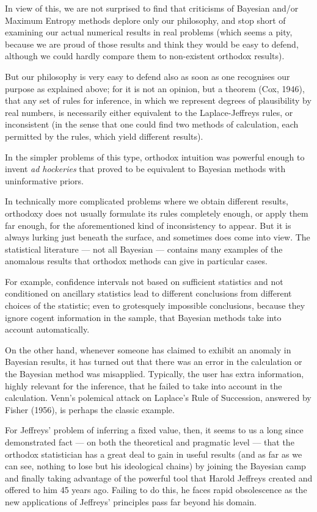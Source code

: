 \documentclass[12pt]{article}
\begin{document}
In view of this, we are not surprised to find that
criticisms of Bayesian and/or Maximum Entropy methods deplore
only our philosophy, and stop short of examining our actual
numerical results in real problems (which seems a pity, because
we are proud of those results and think they would be easy to
defend, although we could hardly compare them to non-existent
orthodox results).

But our philosophy is very easy to defend also as soon as
one recognises our purpose as explained above; for it is not an
opinion, but a theorem (Cox, 1946), that any set of rules for
inference, in which we represent degrees of plausibility by
real numbers, is necessarily either equivalent to the Laplace-Jeffreys rules, or inconsistent (in the sense that one could find two methods of calculation, each permitted by the rules,
which yield different results).

In the simpler problems of this type, orthodox intuition
was powerful enough to invent \emph{ad hockeries} that proved to be
equivalent to Bayesian methods with uninformative priors.

In technically more complicated problems where we obtain
different results, orthodoxy does not usually formulate its
rules completely enough, or apply them far enough, for the
aforementioned kind of inconsistency to appear. But it is
always lurking just beneath the surface, and sometimes does
come into view. The statistical literature --- not all Bayesian
--- contains many examples of the anomalous results that
orthodox methods can give in particular cases.

For example, confidence intervals not based on sufficient
statistics and not conditioned on ancillary statistics lead to
different conclusions from different choices of the statistic;
even to grotesquely impossible conclusions, because they ignore
cogent information in the sample, that Bayesian methods take
into account automatically.

On the other hand, whenever someone has claimed to exhibit
an anomaly in Bayesian results, it has turned out that there
was an error in the calculation or the Bayesian method was
misapplied. Typically, the user has extra information, highly
relevant for the inference, that he failed to take into account
in the calculation. Venn's polemical attack on Laplace's Rule
of Succession, answered by Fisher (1956), is perhaps the
classic example.

For Jeffreys' problem of inferring a fixed value, then, it
seems to us a long since demonstrated fact --- on both the
theoretical and pragmatic level ---  that the orthodox
statistician has a great deal to gain in useful results (and as
far as we can see, nothing to lose but his ideological chains)
by joining the Bayesian camp and finally taking advantage of
the powerful tool that Harold Jeffreys created and offered to
him 45 years ago. Failing to do this, he faces rapid
obsolescence as the new applications of Jeffreys' principles
pass far beyond his domain.
\end{document}
